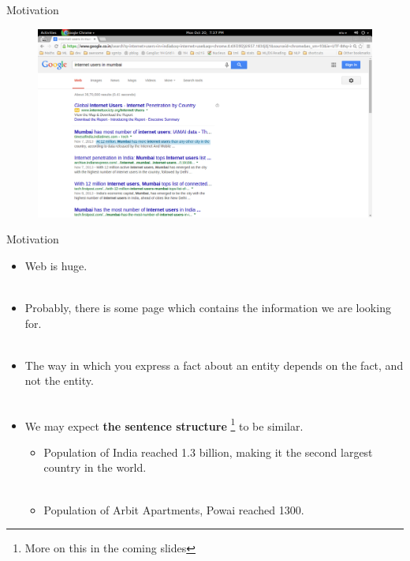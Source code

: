 \documentclass{beamer}
\begin{document}
\begin{frame}{Motivation}
 \begin{figure}[h]
 \centering
 \includegraphics[bb=0 0 1366 741,scale=0.25]{./imgs/resultmumbai.png}
\end{figure}
\end{frame}

\begin{frame}{Motivation}

\begin{itemize}
 \item  Web is huge.  \pause \\~\\
 \item Probably, there is some page which contains the information we are looking for. \pause \\~\\
 \item The way in which you express a fact about an entity depends on the fact, and not the entity. \pause \\~\\
 \item We may expect \textbf{the sentence structure} \footnote{More on this in the coming slides} to be similar. \pause
 \begin{itemize}
    \item Population of India reached 1.3 billion, making it the second largest country in the world. \pause \\~\\
    \item Population of Arbit Apartments, Powai reached 1300.
 \end{itemize}
 
\end{itemize}
\end{frame}
\end{document}
